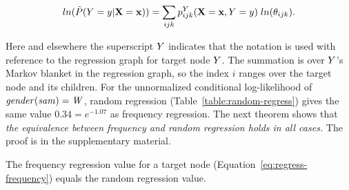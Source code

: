 \documentclass[twoside,leqno,twocolumn]{article}
\begin{document}
\begin{equation} \label{eq:regress-frequency}
ln(\tilde{P}(Y = y|\mathbf{X}=\mathbf{x})) = \sum_{ijk} p^{Y}_{ijk}(\mathbf{X}=\mathbf{x},Y = y) \; ln(\theta_{ijk}).
\end{equation}

Here and elsewhere the superscript $Y$ indicates that the notation is used with reference to the regression graph for target node $Y$. The summation is over $Y$'s Markov blanket in the regression graph, so the index $i$ ranges over the target node and its children. 
%
For the unnormalized conditional log-likelihood of $\it{gender}(sam) = W$, random regression (Table~\ref{table:random-regress}) gives the same value $0.34 = e^{-1.07}$ as frequency regression.
The next theorem shows that {\em the  equivalence between frequency and random regression holds in all cases.}  The proof is in the supplementary material. 
\begin{theorem} \label{prop:randomize}
The frequency regression value  for a target node (Equation~\eqref{eq:regress-frequency}) equals the random regression value. 
\end{theorem}


%



\end{document}
